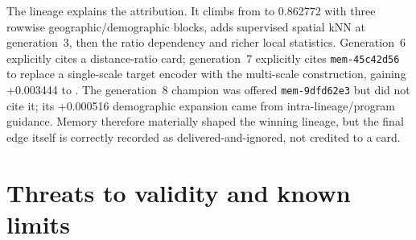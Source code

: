 \documentclass[11pt]{article}
\begin{document}
The lineage explains the attribution. It climbs from \memSeedCV{} to 0.862772 with three
rowwise geographic/demographic blocks, adds supervised spatial kNN at generation~3, then
the ratio dependency and richer local statistics. Generation~6 explicitly cites a
distance-ratio card; generation~7 explicitly cites
\texttt{mem-45c42d56} to replace a single-scale target encoder with the multi-scale
construction, gaining +0.003444 to \memExplicitBestCV{}. The generation~8 champion was
offered \texttt{mem-9dfd62e3} but did not cite it; its +0.000516 demographic expansion came
from intra-lineage/program guidance. Memory therefore materially shaped the winning
lineage, but the final edge itself is correctly recorded as delivered-and-ignored, not
credited to a card.

\section{Threats to validity and known limits}
\end{document}
